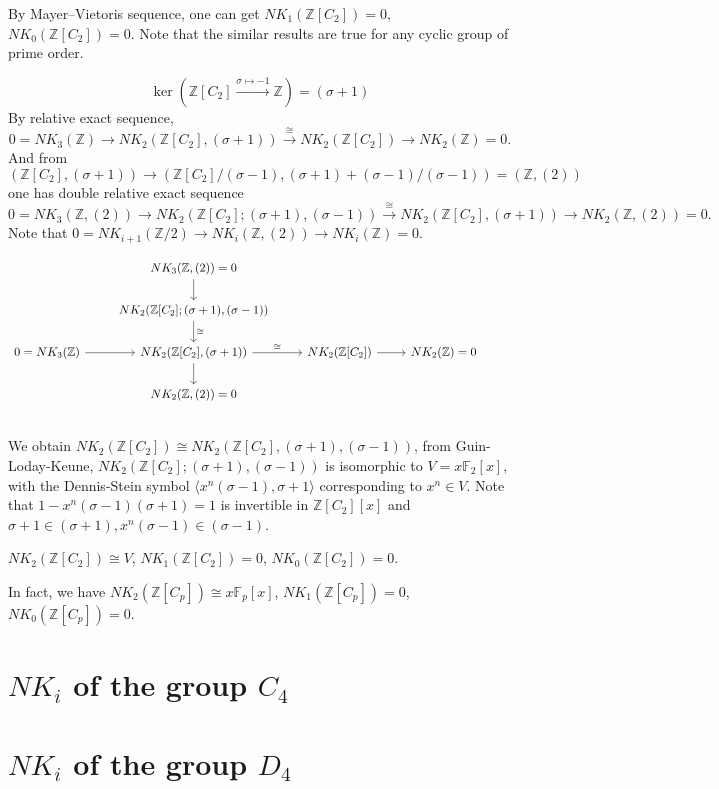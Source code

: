 By Mayer–Vietoris sequence, one can get $NK_1(\mathbb{Z}[C_2])=0$, $NK_0(\mathbb{Z}[C_2])=0$. Note that the similar results are true for any cyclic group of prime order.

\[\ker(\mathbb{Z}[C_2]\overset{\sigma \mapsto -1}\longrightarrow \mathbb{Z}) =(\sigma +1)\]
By relative exact sequence,
\[0=NK_3(\mathbb{Z})\longrightarrow NK_2(\mathbb{Z}[C_2],(\sigma+1))\overset{\cong}\longrightarrow NK_2(\mathbb{Z}[C_2])\longrightarrow NK_2(\mathbb{Z})=0.\]
And from $(\mathbb{Z}[C_2],(\sigma+1))\longrightarrow (\mathbb{Z}[C_2]/(\sigma-1),(\sigma+1)+(\sigma-1)/(\sigma-1))=(\mathbb{Z},(2))$ one has double relative exact sequence
\[0=NK_3(\mathbb{Z},(2))\longrightarrow NK_2(\mathbb{Z}[C_2];(\sigma+1),(\sigma-1))\overset{\cong}\longrightarrow NK_2(\mathbb{Z}[C_2],(\sigma+1))\longrightarrow NK_2(\mathbb{Z},(2))=0.\]
Note that $0=NK_{i+1}(\mathbb{Z}/2)\longrightarrow NK_i(\mathbb{Z},(2))\longrightarrow NK_i(\mathbb{Z})=0$.

\[\begin{tikzcd}
	 & NK_3(\mathbb{Z},(2))=0 \ar[d] & & & \\
	 & NK_2(\mathbb{Z}[C_2];(\sigma+1),(\sigma-1)) \ar[d,"\cong"] \\
0=NK_3(\mathbb{Z})	\ar[r] & NK_2(\mathbb{Z}[C_2],(\sigma+1)) \ar[r,"\cong"] \ar[d] & NK_2(\mathbb{Z}[C_2]) \ar[r] &NK_2(\mathbb{Z})=0\\
	& NK_2(\mathbb{Z},(2))=0 \\
\end{tikzcd}
\]
We obtain $NK_2(\mathbb{Z}[C_2])\cong NK_2(\mathbb{Z}[C_2],(\sigma+1),(\sigma-1))$, from Guin-Loday-Keune\cite{Guin-Waléry1981}, $NK_2(\mathbb{Z}[C_2];(\sigma+1),(\sigma-1))$ is isomorphic to $V=x \mathbb{F}_2[x]$, with the Dennis-Stein symbol $\langle x^n(\sigma-1),\sigma+1 \rangle$ corresponding to $x^n\in V$. Note that $1-x^n(\sigma-1)(\sigma+1)=1$ is invertible in $\mathbb{Z}[C_2][x]$ and $\sigma+1 \in (\sigma+1), x^n(\sigma-1) \in (\sigma-1)$.

\begin{theorem}
	$NK_2(\mathbb{Z}[C_2])\cong V$, $NK_1(\mathbb{Z}[C_2])=0$, $NK_0(\mathbb{Z}[C_2])=0$.
\end{theorem}

In fact, we have $NK_2(\mathbb{Z}[C_p])\cong x \mathbb{F}_p[x]$, $NK_1(\mathbb{Z}[C_p])=0$, $NK_0(\mathbb{Z}[C_p])=0$.



\section{\texorpdfstring{$NK_i$}{NKi} of the group \texorpdfstring{$C_4$}{C4}}
\label{sec:C4}
\section{\texorpdfstring{$NK_i$}{NKi} of the group \texorpdfstring{$D_4$}{D4}}
\label{sec:D4}